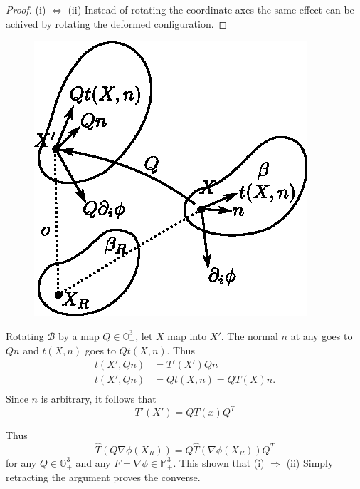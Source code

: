 \begin{proof}
(i) $\Leftrightarrow$ (ii) Instead of rotating the coordinate axes the
  same effect can be achived by rotating the deformed configuration.
\end{proof}

\begin{figure}[H]
\centering
\includegraphics{vol71-figures/fig1.3-1.eps}
\medskip
\caption{}\label{fig.1.3.1}
\end{figure}

Rotating $\mathcal{B}$ by a map $Q \in \mathbb{O}^3_+$, let $X$ map
into $X'$. The normal $n$ at any goes to $Qn$ and $t(X, n)$ goes to
$Qt(X, n)$. Thus  
\begin{align*}
t(X', Qn)& = T' (X')Qn\\
t(X', Qn)& = Q t(X, n)= QT(X)n. \\
\end{align*}\pageoriginale
Since $n$ is arbitrary, it follows that 
\begin{equation*}
T'(X')=QT(x)Q^T \tag{1.3-7}\label{eq1.3-7}
\end{equation*}

Thus 
$$
\hat{T}(Q \nabla \phi(X_R))= Q \hat{T}(\nabla \phi(X_R)) Q^T
$$
for any $Q \in \mathbb{O}^3_+$ and any $F =\nabla \phi \in
\mathbb{M}^3_+$. This shown that (i) $\Rightarrow$ (ii) Simply
retracting the argument proves the converse.  

